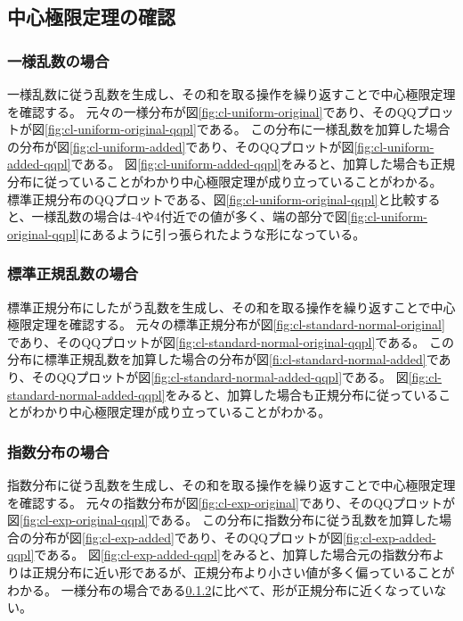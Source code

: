 \subsection{中心極限定理の確認}

\subsubsection{一様乱数の場合}\label{subsubsec:cl-uniform}
一様乱数に従う乱数を生成し、その和を取る操作を繰り返すことで中心極限定理を確認する。
元々の一様分布が図\ref{fig:cl-uniform-original}であり、そのQQプロットが図\ref{fig:cl-uniform-original-qqpl}である。
この分布に一様乱数を加算した場合の分布が図\ref{fig:cl-uniform-added}であり、そのQQプロットが図\ref{fig:cl-uniform-added-qqpl}である。
図\ref{fig:cl-uniform-added-qqpl}をみると、加算した場合も正規分布に従っていることがわかり中心極限定理が成り立っていることがわかる。
標準正規分布のQQプロットである、図\ref{fig:cl-uniform-original-qqpl}と比較すると、一様乱数の場合は-4や4付近での値が多く、端の部分で図\ref{fig:cl-uniform-original-qqpl}にあるように引っ張られたような形になっている。


\subsubsection{標準正規乱数の場合}\label{subsubsec:cl-standard-normal}
標準正規分布にしたがう乱数を生成し、その和を取る操作を繰り返すことで中心極限定理を確認する。
元々の標準正規分布が図\ref{fig:cl-standard-normal-original}であり、そのQQプロットが図\ref{fig:cl-standard-normal-original-qqpl}である。
この分布に標準正規乱数を加算した場合の分布が図\ref{fi:cl-standard-normal-added}であり、そのQQプロットが図\ref{fig:cl-standard-normal-added-qqpl}である。
図\ref{fig:cl-standard-normal-added-qqpl}をみると、加算した場合も正規分布に従っていることがわかり中心極限定理が成り立っていることがわかる。


\subsubsection{指数分布の場合}\label{subsubsec:cl-exp}
指数分布に従う乱数を生成し、その和を取る操作を繰り返すことで中心極限定理を確認する。
元々の指数分布が図\ref{fig:cl-exp-original}であり、そのQQプロットが図\ref{fig:cl-exp-original-qqpl}である。
この分布に指数分布に従う乱数を加算した場合の分布が図\ref{fig:cl-exp-added}であり、そのQQプロットが図\ref{fig:cl-exp-added-qqpl}である。
図\ref{fig:cl-exp-added-qqpl}をみると、加算した場合元の指数分布よりは正規分布に近い形であるが、正規分布より小さい値が多く偏っていることがわかる。
一様分布の場合である\ref{subsubsec:cl-standard-normal}に比べて、形が正規分布に近くなっていない。


